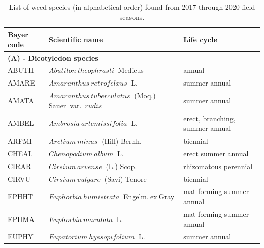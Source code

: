 \documentclass[
]{article}
\begin{document}
\begin{table}

\caption{\label{tab:list-sp}List of weed species (in alphabetical order) found from 2017 through 2020 field seasons.}
\centering
\begin{tabular}[t]{l|l|l}
\hline
Bayer code & Scientific name & Life cycle\\
\hline
\multicolumn{3}{l}{\textbf{(A) - Dicotyledon species}}\\
\hline
\hspace{1em}ABUTH & $Abutilon~theophrasti$$~$ Medicus & annual\\
 
\hspace{1em}AMARE & $Amaranthus~retrofelxus$$~$ L. & summer annual\\
 
\hspace{1em}AMATA & $Amaranthus~tuberculatus$$~$ (Moq.) Sauer~var.~$rudis$ & summer annual\\
 
\hspace{1em}AMBEL & $Ambrosia~artemissifolia$$~$ L. & erect, branching, summer annual\\
 
\hspace{1em}ARFMI & $Arctium~minus$$~$ (Hill) Bernh. & biennial\\
 
\hspace{1em}CHEAL & $Chenopodium~album$$~$ L. & erect summer annual\\
 
\hspace{1em}CIRAR & $Cirsium~arvense$$~$ (L.) Scop. & rhizomatous perennial\\
 
\hspace{1em}CIRVU & $Cirsium~vulgare$$~$ (Savi) Tenore & biennial\\
 
\hspace{1em}EPHHT & $Euphorbia~humistrata$$~$ Engelm.$~$ex$~$Gray & mat-forming summer annual\\
 
\hspace{1em}EPHMA & $Euphorbia~maculata$$~$ L. & mat-forming summer annual\\
 
\hspace{1em}EUPHY & $Eupatorium~hyssopifolium$$~$ L. & summer annual\\
 

\end{tabular}
\end{table}
\end{document}
